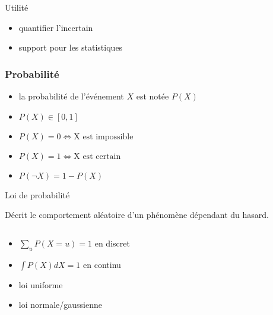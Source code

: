 
\begin{frame}{Utilité}
  \begin{itemize}
  \item quantifier l'incertain
  \item support pour les statistiques
  \end{itemize}
\end{frame}

\begin{frame}
  \frametitle{Probabilité}

  \begin{itemize}
  \item la probabilité de l'événement $X$ est notée $P(X)$
  \item $P(X) \in [0, 1]$
  \item $P(X)=0 \iff \text{X est impossible}$
  \item $P(X)=1 \iff \text{X est certain}$
  \item $P(\neg X) = 1 - P(X)$
  
  \end{itemize}
\end{frame}

\begin{frame}{Loi de probabilité}

  Décrit le comportement aléatoire d'un phénomène dépendant du hasard.
  \begin{columns}
    \begin{column}{.5\textwidth}
      \begin{itemize}
      \item $\sum_uP(X = u) = 1$ en discret
      \item $\int P(X)dX = 1$ en continu
      \item loi uniforme
      \item loi normale/gaussienne
      \end{itemize}
    \end{column}
    \begin{column}{.5\textwidth}
    \end{column}
  \end{columns}
\end{frame}
